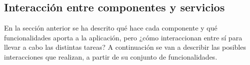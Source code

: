 


\pagestyle{miEstilo503}


\subsection{Interacción entre componentes y servicios}

En la sección anterior se ha descrito qué hace cada componente y qué funcionalidades aporta a la aplicación, pero ¿cómo interaccionan entre sí para llevar a cabo las distintas tareas? A continuación se van a describir las posibles interacciones que realizan, a partir de su conjunto de funcionalidades.

